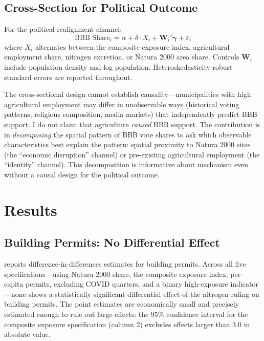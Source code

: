 \documentclass[12pt]{article}
\begin{document}
\subsection{Cross-Section for Political Outcome}

For the political realignment channel:
\begin{equation}
\text{BBB Share}_i = \alpha + \delta \cdot X_i + \mathbf{W}_i' \boldsymbol{\gamma} + \varepsilon_i \label{eq:cross}
\end{equation}
where $X_i$ alternates between the composite exposure index, agricultural employment share, nitrogen excretion, or Natura 2000 area share. Controls $\mathbf{W}_i$ include population density and log population. Heteroskedasticity-robust standard errors are reported throughout.

The cross-sectional design cannot establish causality---municipalities with high agricultural employment may differ in unobservable ways (historical voting patterns, religious composition, media markets) that independently predict BBB support. I do not claim that agriculture \textit{caused} BBB support. The contribution is in \textit{decomposing} the spatial pattern of BBB vote shares to ask which observable characteristics best explain the pattern: spatial proximity to Natura 2000 sites (the ``economic disruption'' channel) or pre-existing agricultural employment (the ``identity'' channel). This decomposition is informative about mechanism even without a causal design for the political outcome.

\section{Results}

\subsection{Building Permits: No Differential Effect}



 reports difference-in-differences estimates for building permits. Across all five specifications---using Natura 2000 share, the composite exposure index, per-capita permits, excluding COVID quarters, and a binary high-exposure indicator---none shows a statistically significant differential effect of the nitrogen ruling on building permits. The point estimates are economically small and precisely estimated enough to rule out large effects: the 95\% confidence interval for the composite exposure specification (column 2) excludes effects larger than 3.0 in absolute value.
\end{document}
